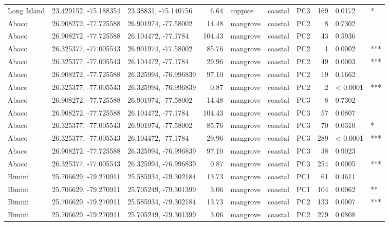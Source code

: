 \begin{table}[H]
\begin{tabular}{l|l|l|r|l|l|l|r|l|l}
        Long Island & 23.429152, -75.188354 & 23.38831, -75.140756 & 6.64 & coppice & coastal & PC3 & 169 & 0.0172 & *\\
        Abaco & 26.908272, -77.725588 & 26.901974, -77.58002 & 14.48 & mangrove & coastal & PC2 & 8 & 0.7302 & \\
        Abaco & 26.908272, -77.725588 & 26.104472, -77.1784 & 104.43 & mangrove & coastal & PC2 & 43 & 0.5936 & \\
        Abaco & 26.325377, -77.005543 & 26.901974, -77.58002 & 85.76 & mangrove & coastal & PC2 & 1 & 0.0002 & ***\\
        Abaco & 26.325377, -77.005543 & 26.104472, -77.1784 & 29.96 & mangrove & coastal & PC2 & 49 & 0.0003 & ***\\
        Abaco & 26.908272, -77.725588 & 26.325994, -76.996839 & 97.10 & mangrove & coastal & PC2 & 19 & 0.1662 & \\
        Abaco & 26.325377, -77.005543 & 26.325994, -76.996839 & 0.87 & mangrove & coastal & PC2 & 2 & < 0.0001 & ***\\
        Abaco & 26.908272, -77.725588 & 26.901974, -77.58002 & 14.48 & mangrove & coastal & PC3 & 8 & 0.7302 & \\
        Abaco & 26.908272, -77.725588 & 26.104472, -77.1784 & 104.43 & mangrove & coastal & PC3 & 57 & 0.0807 & \\
        Abaco & 26.325377, -77.005543 & 26.901974, -77.58002 & 85.76 & mangrove & coastal & PC3 & 70 & 0.0310 & *\\
        Abaco & 26.325377, -77.005543 & 26.104472, -77.1784 & 29.96 & mangrove & coastal & PC3 & 289 & < 0.0001 & ***\\
        Abaco & 26.908272, -77.725588 & 26.325994, -76.996839 & 97.10 & mangrove & coastal & PC3 & 38 & 0.9023 & \\
        Abaco & 26.325377, -77.005543 & 26.325994, -76.996839 & 0.87 & mangrove & coastal & PC3 & 254 & 0.0005 & ***\\
        Bimini & 25.706629, -79.270911 & 25.585934, -79.302184 & 13.73 & mangrove & coastal & PC1 & 61 & 0.4611 & \\
        Bimini & 25.706629, -79.270911 & 25.705249, -79.301399 & 3.06 & mangrove & coastal & PC1 & 104 & 0.0062 & **\\
        Bimini & 25.706629, -79.270911 & 25.585934, -79.302184 & 13.73 & mangrove & coastal & PC2 & 133 & 0.0007 & ***\\
        Bimini & 25.706629, -79.270911 & 25.705249, -79.301399 & 3.06 & mangrove & coastal & PC2 & 279 & 0.0808 & \\

\end{tabular}
\end{table}
